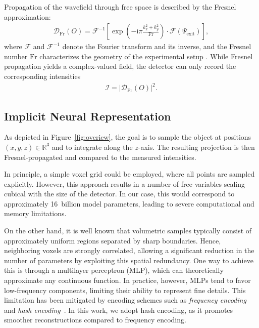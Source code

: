 \documentclass{article}
\begin{document}
Propagation of the wavefield through free space is described by the Fresnel approximation:  
\begin{align}
	\mathcal{D}_{\text{Fr}} \left( O \right) = 
	\mathcal{F}^{-1} \left[ 
		\exp \left( - \mathrm{i} \pi \frac{k_{x}^{2} + k_{y}^{2}}{\text{Fr}} \right) 
		\cdot \mathcal{F} \left( \Psi_{\text{exit}} \right)
	\right],
	\label{eq:fresnel}
\end{align}
where $\mathcal{F}$ and $\mathcal{F}^{-1}$ denote the Fourier transform and its inverse, and the Fresnel number $\text{Fr}$ characterizes the geometry of the experimental setup \cite{paganinCoherentXrayOptics2006a}.
While Fresnel propagation yields a complex-valued field, the detector can only record the corresponding intensities
\begin{align}
	\mathcal{I} = \left| \mathcal{D}_{\text{Fr}} \left( O \right) \right|^{2}.
\end{align}

\subsection{Implicit Neural Representation}
As depicted in Figure~\ref{fig:overiew}, the goal is to sample the object at positions $\left( x,y,z \right) \in \mathbb{R}^{3}$ and to integrate along the $z$-axis.  
The resulting projection is then Fresnel-propagated and compared to the measured intensities.  

In principle, a simple voxel grid could be employed, where all points are sampled explicitly.  
However, this approach results in a number of free variables scaling cubical with the size of the detector.  
In our case, this would correspond to approximately 16~billion model parameters, leading to severe computational and memory limitations.  

On the other hand, it is well known that volumetric samples typically consist of approximately uniform regions separated by sharp boundaries.  
Hence, neighboring voxels are strongly correlated, allowing a significant reduction in the number of parameters by exploiting this spatial redundancy.  
One way to achieve this is through a multilayer perceptron (MLP), which can theoretically approximate any continuous function.  
In practice, however, MLPs tend to favor low-frequency components, limiting their ability to represent fine details.  
This limitation has been mitigated by encoding schemes such as \emph{frequency encoding} and \emph{hash encoding}~\cite{mullerInstantNeuralGraphics2022,mildenhallNeRFRepresentingScenes2020a}.  
In this work, we adopt hash encoding, as it promotes smoother reconstructions compared to frequency encoding.  
\end{document}
